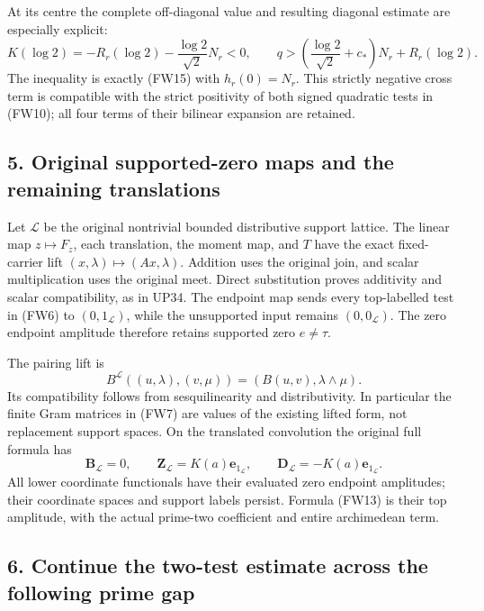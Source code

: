 \documentclass[
  10pt,
  a4paper,
]{article}
\begin{document}
At its centre the complete off-diagonal value and resulting diagonal
estimate are especially explicit: \[
K(\log2)=-R_r(\log2)-\frac{\log2}{\sqrt2}N_r<0,
\qquad
q>\left(\frac{\log2}{\sqrt2}+c_*\right)N_r+R_r(\log2).
\tag{FW16}
\] The inequality is exactly (FW15) with \(h_r(0)=N_r\). This strictly
negative cross term is compatible with the strict positivity of both
signed quadratic tests in (FW10); all four terms of their bilinear
expansion are retained.

\subsection{5. Original supported-zero maps and the remaining
translations}\label{original-supported-zero-maps-and-the-remaining-translations}

Let \(\mathscr L\) be the original nontrivial bounded distributive
support lattice. The linear map \(z\mapsto F_z\), each translation, the
moment map, and \(T\) have the exact fixed-carrier lift
\((x,\lambda)\mapsto(Ax,\lambda)\). Addition uses the original join, and
scalar multiplication uses the original meet. Direct substitution proves
additivity and scalar compatibility, as in UP34. The endpoint map sends
every top-labelled test in (FW6) to \((0,1_{\mathscr L})\), while the
unsupported input remains \((0,0_{\mathscr L})\). The zero endpoint
amplitude therefore retains supported zero \(e\ne\tau\).

The pairing lift is \[
B^{\mathscr L}((u,\lambda),(v,\mu))=(B(u,v),\lambda\wedge\mu).
\tag{FW17}
\] Its compatibility follows from sesquilinearity and distributivity. In
particular the finite Gram matrices in (FW7) are values of the existing
lifted form, not replacement support spaces. On the translated
convolution the original full formula has \[
\boldsymbol B_{\mathscr L}=0,\qquad
\boldsymbol Z_{\mathscr L}=K(a)\mathbf e_{1_{\mathscr L}},\qquad
\boldsymbol D_{\mathscr L}=-K(a)\mathbf e_{1_{\mathscr L}}.
\tag{FW18}
\] All lower coordinate functionals have their evaluated zero endpoint
amplitudes; their coordinate spaces and support labels persist. Formula
(FW13) is their top amplitude, with the actual prime-two coefficient and
entire archimedean term.

\subsection{6. Continue the two-test estimate across the following prime
gap}\label{continue-the-two-test-estimate-across-the-following-prime-gap}
\end{document}
